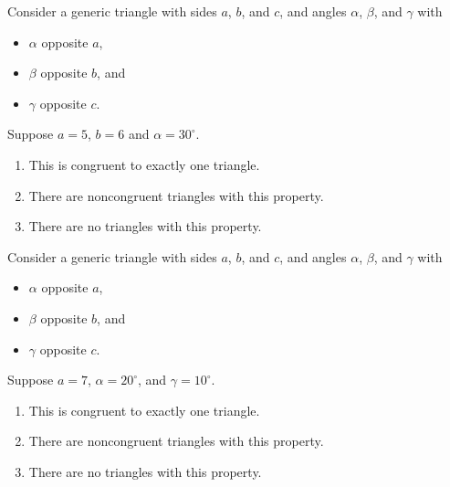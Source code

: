 \documentclass[nooutcomes,noauthor]{ximera}
\begin{document}
\begin{exercise}
  Consider a generic triangle with sides $a$, $b$, and $c$, and angles
  $\alpha$, $\beta$, and $\gamma$ with
  \begin{itemize}
  \item $\alpha$ opposite $a$,
  \item $\beta$ opposite $b$, and
  \item $\gamma$ opposite $c$.
  \end{itemize}
  Suppose $a=5$, $b=6$ and $\alpha = 30^\circ$.
  \begin{enumerate}
  \item This is congruent to exactly one triangle.
  \item There are noncongruent triangles with this property.
  \item There are no triangles with this property.
  \end{enumerate}
\end{exercise}


\begin{exercise}
  Consider a generic triangle with sides $a$, $b$, and $c$, and angles
  $\alpha$, $\beta$, and $\gamma$ with
  \begin{itemize}
  \item $\alpha$ opposite $a$,
  \item $\beta$ opposite $b$, and
  \item $\gamma$ opposite $c$.
  \end{itemize}
  Suppose $a=7$, $\alpha = 20^\circ$, and $\gamma = 10^\circ$.
  \begin{enumerate}
  \item This is congruent to exactly one triangle.
  \item There are noncongruent triangles with this property.
  \item There are no triangles with this property.
  \end{enumerate}
\end{exercise}







\end{document}
